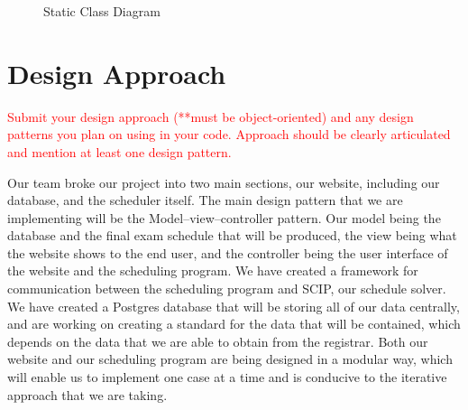 \documentclass[11pt]{article}
\begin{document}
\begin{figure}
	\centering
	\caption{Static Class Diagram}
	\label{fig:staticDiagram}
\end{figure}


\section*{ Design Approach}  %
\textcolor{red}{
Submit your design approach (**must be object-oriented) and any design patterns you plan on using in your code. Approach should be clearly articulated and mention at least one design pattern.}

Our team broke our project into two main sections, our website, including our database, and the scheduler itself. The main design pattern that we are implementing will be the Model–view–controller pattern. Our model being the database and the final exam schedule that will be produced, the view being what the website shows to the end user, and the controller being the user interface of the website and the scheduling program. We have created a framework for communication between the scheduling program and SCIP, our schedule solver. We have created a Postgres database that will be storing all of our data centrally, and are working on creating a standard for the data that will be contained, which depends on the data that we are able to obtain from the registrar. Both our website and our scheduling program are being designed in a modular way, which will enable us to implement one case at a time and is conducive to the iterative approach that we are taking.


\end{document}
